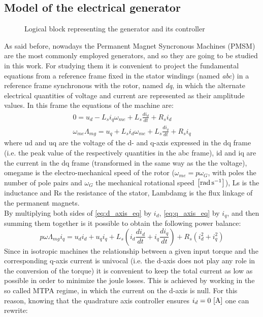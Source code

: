 \subsection[Electrical generator]{Model of the electrical generator}\label{subsec:electrical_generator_description}
\begin{figure}[htb]
  \centering
  
  \caption{Logical block representing the generator and its controller}
  \label{fig:d_generator_block}
\end{figure}

As said before, nowadays the Permanent Magnet Syncronous Machines (PMSM) are the most commonly employed generators, and so they are going to be studied in this work. For studying them it is convenient to project the fundamental equations from a reference frame fixed in the stator windings (named \textit{abc}) in a reference frame synchronous with the rotor, named \textit{dq}, in which the alternate electrical quantities of voltage and current are represented as their amplitude values. 
In this frame the equations of the machine are:
\begin{gather}
  0=u_d-L_{s}i_q\omega_{me}+L_{s}\frac{di_d}{dt}+R_{s}i_d 
  \label{eq:d_axis_eq}\\
  \omega_{me}\Lambda_{mg}=u_q+L_{s}i_d\omega_{me}+L_{s}\frac{di_q}{dt}+R_{s}i_q
  \label{eq:q_axis_eq}
\end{gather}
where \acrshort{ud} and \acrshort{uq} are the voltage of the d- and q-axis expressed in the dq frame (i.e. the peak value of the respectively quantities in the abc frame), \acrshort{id} and \acrshort{iq} are the current in the dq frame (transformed in the same way as the the voltage), \acrshort{omegame} is the electro-mechanical speed of the rotor ($\omega_{me}=p\omega_G$, with \acrshort{poles} the number of pole pairs and $\omega_G$ the mechanical rotational speed $\left[\si{\radian \per \second}\right]$), \acrshort{Ls} is the inductance and \acrshort{Rs} the resistance of the stator, \acrshort{Lambdamg} is the flux linkage of the permanent magnets.\\
By multiplying both sides of \autoref{eq:d_axis_eq} by $i_d$, \autoref{eq:q_axis_eq} by $i_q$, and then summing them together is it possible to obtain the following power balance:
\begin{equation}
  p\omega\Lambda_{mg}i_q=u_di_d + u_qi_q+ L_{s}\left(i_d\frac{di_d}{dt} + i_q\frac{di_q}{dt}\right) + R_{s}(i_d^2 + i_q^2)
  \label{eq:gen_power_balance}
\end{equation}
Since in isotropic machines the relationship between a given input torque and the corresponding q-axis current is univocal (i.e. the d-axis does not play any role in the conversion of the torque) it is convenient to keep the total current as low as possible in order to minimize the joule losses. This is achieved by working in the so called \acrfull{MTPA} regime, in which the current on the d-axis is null. For this reason, knowing that the quadrature axis controller ensures $i_d=0 \, \left[\si{\ampere}\right]$ one can rewrite:
